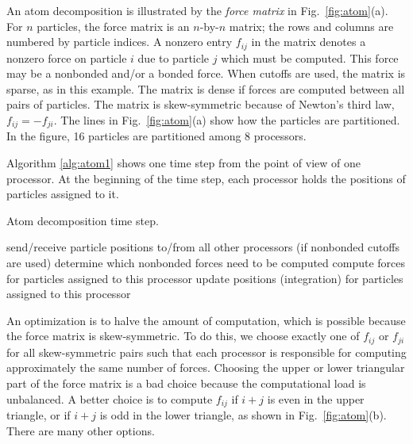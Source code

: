 An atom decomposition is illustrated by the {\em force matrix} in
Fig.~\ref{fig:atom}(a).  For $n$ particles, the force matrix is an $n$-by-$n$
matrix; the rows and columns are numbered by particle indices.  A nonzero
entry $f_{ij}$ in the matrix denotes a nonzero force on particle $i$
due to particle $j$ which must be computed.  This force may be a nonbonded
and/or a bonded force.  When cutoffs are used, the matrix is sparse, as
in this example.  The matrix is dense if forces are computed between all
pairs of particles.  The matrix is skew-symmetric because of Newton's 
third law, $f_{ij} = -f_{ji}$.
The lines in Fig.~\ref{fig:atom}(a) show how the particles are
partitioned.  In the figure, 16 particles are partitioned among
8 processors.

Algorithm \ref{alg:atom1} shows one time step from the point of view of
one processor.  At the beginning of the time step,
each processor holds the positions of particles assigned to it.
\begin{algorithm}
\caption{Atom decomposition time step.}
\label{alg:atom1}
\begin{algorithmic}[1]
\STATE send/receive particle positions to/from all other processors
\STATE (if nonbonded cutoffs are used) determine which nonbonded forces need to be computed
\STATE compute forces for particles assigned to this processor
\STATE update positions (integration) for particles assigned to this processor
\end{algorithmic}
\end{algorithm}

An optimization is to halve the amount of computation, which is possible because the
force matrix is skew-symmetric.  To do this, we choose
exactly one of $f_{ij}$ or $f_{ji}$ for all skew-symmetric pairs such that each
processor is responsible for computing approximately the same number of
forces.  Choosing the upper or lower triangular part of the force matrix
is a bad choice because the computational load is unbalanced.  A better
choice is to compute $f_{ij}$ if $i+j$ is even in the upper triangle, or
if $i+j$ is odd in the lower triangle, as shown in Fig.~\ref{fig:atom}(b).
There are many other options.

